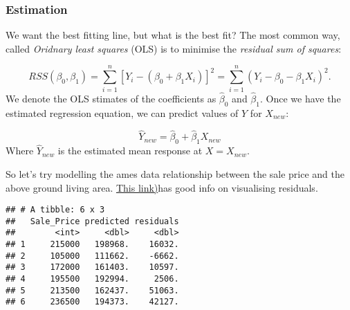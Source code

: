 \documentclass[]{article}
\newenvironment{Shaded}{\begin{snugshade}}{\end{snugshade}}
\newcommand{\CommentTok}[1]{\textcolor[rgb]{0.56,0.35,0.01}{\textit{#1}}}
\newcommand{\DataTypeTok}[1]{\textcolor[rgb]{0.13,0.29,0.53}{#1}}
\newcommand{\KeywordTok}[1]{\textcolor[rgb]{0.13,0.29,0.53}{\textbf{#1}}}
\newcommand{\NormalTok}[1]{#1}
\newcommand{\OperatorTok}[1]{\textcolor[rgb]{0.81,0.36,0.00}{\textbf{#1}}}
\newcommand{\StringTok}[1]{\textcolor[rgb]{0.31,0.60,0.02}{#1}}
\begin{document}
\hypertarget{estimation}{%
\subsubsection{Estimation}\label{estimation}}

We want the best fitting line, but what is the best fit? The most common
way, called \emph{Oridnary least squares} (OLS) is to minimise the
\emph{residual sum of squares}:

\[RSS(\beta_0,\beta_1)=\sum^{n}_{i=1}[Y_i-(\beta_0+\beta_1X_i)]^2=\sum^{n}_{i=1}(Y_i-\beta_0-\beta_1X_i)^2.\]
We denote the OLS stimates of the coefficients as \(\hat \beta_0\) and
\(\hat \beta_1\). Once we have the estimated regression equation, we can
predict values of \(Y\) for \(X_{new}\):

\[\hat Y_{new} = \hat \beta_0 + \hat \beta_1 X_{new}\] Where
\(\hat Y_{new}\) is the estimated mean response at \(X = X_{new}\).

So let's try modelling the ames data relationship between the sale price
and the above ground living area.
\href{https://drsimonj.svbtle.com/visualising-residuals}{This link)}has
good info on visualising residuals.

\begin{Shaded}
\end{Shaded}

\begin{verbatim}
## # A tibble: 6 x 3
##   Sale_Price predicted residuals
##        <int>     <dbl>     <dbl>
## 1     215000   198968.    16032.
## 2     105000   111662.    -6662.
## 3     172000   161403.    10597.
## 4     195500   192994.     2506.
## 5     213500   162437.    51063.
## 6     236500   194373.    42127.
\end{verbatim}
\end{document}
